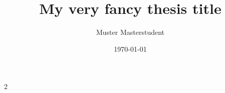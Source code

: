 \documentclass[
    ieee, %
    bachelor, %
    english %
]{expose}
\title{My very fancy thesis title}
\author{Muster Masterstudent}
\date{\today}
\begin{document}
\maketitle
\thispagestyle{firstpage}
\pagestyle{pages}
\begin{multicols}{2}
	
	
	
	
	\makebibliography
\end{multicols}
\end{document}
